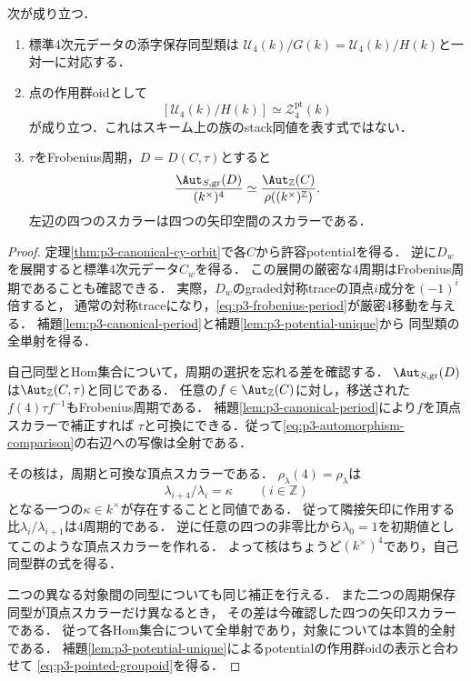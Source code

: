 \begin{theorem}[体上のpotential軌道による比較]
\label{thm:p3-potential-moduli}
次が成り立つ．
\begin{enumerate}[label=\textup{(\roman*)}]
\item 標準4次元データの添字保存同型類は
$\mathcal U_4(k)/G(k)=\mathcal U_4(k)/H(k)$と一対一に対応する．
\item 点の作用群oidとして
\begin{equation}\label{eq:p3-pointed-groupoid}
 [\mathcal U_4(k)/H(k)]\simeq\mathcal Z_4^{\mathrm{pt}}(k)
\end{equation}
が成り立つ．これはスキーム上の族のstack同値を表す式ではない．
\item $\tau$をFrobenius周期，$D=D(C,\tau)$とすると
\begin{equation}\label{eq:p3-automorphism-comparison}
 \frac{\Aut_{S,\mathrm{gr}}(D)}{(k^\times)^4}
 \simeq
 \frac{\Aut_{\mathbb Z}(C)}{\rho((k^\times)^{\mathbb Z})}.
\end{equation}
左辺の四つのスカラーは四つの矢印空間のスカラーである．
\end{enumerate}
\end{theorem}
\begin{proof}
定理\ref{thm:p3-canonical-cy-orbit}で各$C$から許容potentialを得る．
逆に$D_w$を展開すると標準4次元データ$C_w$を得る．
この展開の厳密な4周期はFrobenius周期であることも確認できる．
実際，$D_w$のgraded対称traceの頂点$i$成分を$(-1)^i$倍すると，
通常の対称traceになり，\eqref{eq:p3-frobenius-period}が厳密4移動を与える．
補題\ref{lem:p3-canonical-period}と補題\ref{lem:p3-potential-unique}から
同型類の全単射を得る．

自己同型とHom集合について，周期の選択を忘れる差を確認する．
$\Aut_{S,\mathrm{gr}}(D)$は$\Aut_{\mathbb Z}(C,\tau)$と同じである．
任意の$f\in\Aut_{\mathbb Z}(C)$に対し，移送された
$f(4)\tau f^{-1}$もFrobenius周期である．
補題\ref{lem:p3-canonical-period}により$f$を頂点スカラーで補正すれば
$\tau$と可換にできる．従って\eqref{eq:p3-automorphism-comparison}の右辺への写像は全射である．

その核は，周期と可換な頂点スカラーである．
$\rho_\lambda(4)=\rho_\lambda$は
\[
 \lambda_{i+4}/\lambda_i=\kappa\qquad(i\in\mathbb Z)
\]
となる一つの$\kappa\in k^\times$が存在することと同値である．
従って隣接矢印に作用する比$\lambda_i/\lambda_{i+1}$は4周期的である．
逆に任意の四つの非零比から$\lambda_0=1$を初期値としてこのような頂点スカラーを作れる．
よって核はちょうど$(k^\times)^4$であり，自己同型群の式を得る．

二つの異なる対象間の同型についても同じ補正を行える．
また二つの周期保存同型が頂点スカラーだけ異なるとき，
その差は今確認した四つの矢印スカラーである．
従って各Hom集合について全単射であり，対象については本質的全射である．
補題\ref{lem:p3-potential-unique}によるpotentialの作用群oidの表示と合わせて
\eqref{eq:p3-pointed-groupoid}を得る．
\end{proof}

